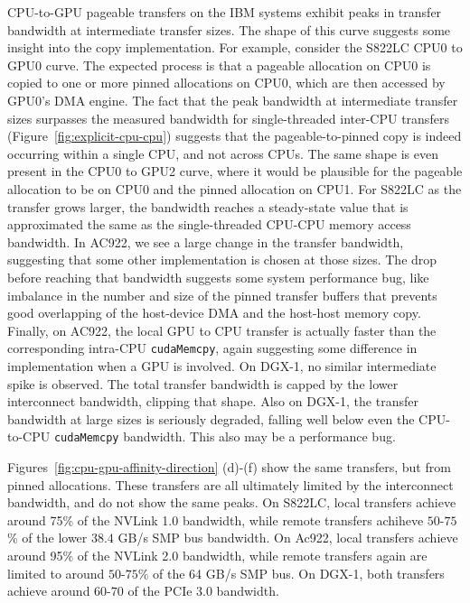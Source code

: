 CPU-to-GPU pageable transfers on the IBM systems exhibit peaks in transfer bandwidth at intermediate transfer sizes.
The shape of this curve suggests some insight into the copy implementation.
For example, consider the S822LC CPU0 to GPU0 curve.
The expected process is that a pageable allocation on CPU0 is copied to one or more pinned allocations on CPU0, which are then accessed by GPU0's DMA engine.
The fact that the peak bandwidth at intermediate transfer sizes surpasses the measured bandwidth for single-threaded inter-CPU transfers (Figure~\ref{fig:explicit-cpu-cpu}) suggests that the pageable-to-pinned copy is indeed occurring within a single CPU, and not across CPUs.
The same shape is even present in the CPU0 to GPU2 curve, where it would be plausible for the pageable allocation to be on CPU0 and the pinned allocation on CPU1.
For S822LC as the transfer grows larger, the bandwidth reaches a steady-state value that is approximated the same as the single-threaded CPU-CPU memory access bandwidth.
In AC922, we see a large change in the transfer bandwidth, suggesting that some other implementation is chosen at those sizes.
The drop before reaching that bandwidth suggests some system performance bug, like imbalance in the number and size of the pinned transfer buffers that prevents good overlapping of the host-device DMA and the host-host memory copy.
Finally, on AC922, the local GPU to CPU transfer is actually faster than the corresponding intra-CPU \texttt{cudaMemcpy}, again suggesting some difference in implementation when a GPU is involved.
On DGX-1, no similar intermediate spike is observed.
The total transfer bandwidth is capped by the lower interconnect bandwidth, clipping that shape.
Also on DGX-1, the transfer bandwidth at large sizes is seriously degraded, falling well below even the CPU-to-CPU \texttt{cudaMemcpy} bandwidth.
This also may be a performance bug.

Figures~\ref{fig:cpu-gpu-affinity-direction} (d)-(f) show the same transfers, but from pinned allocations.
These transfers are all ultimately limited by the interconnect bandwidth, and do not show the same peaks.
On S822LC, local transfers achieve around 75\% of the NVLink 1.0 bandwidth, while remote transfers achiheve $50$-$75$\% of the lower $38.4$ GB/s SMP bus bandwidth.
On Ac922, local transfers achieve around 95\% of the NVLink 2.0 bandwidth, while remote transfers again are limited to around $50$-$75$\% of the 64 GB/s SMP bus.
On DGX-1, both transfers achieve around $60$-$70$ of the PCIe 3.0 bandwidth.

